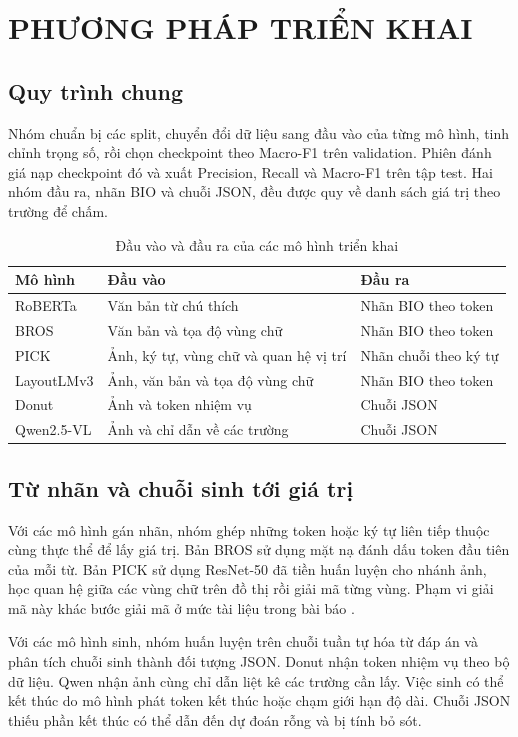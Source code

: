 \chapter{PHƯƠNG PHÁP TRIỂN KHAI}
\section{Quy trình chung}
Nhóm chuẩn bị các split, chuyển đổi dữ liệu sang đầu vào của từng mô hình, tinh chỉnh trọng số, rồi chọn checkpoint theo Macro-F1 trên validation. Phiên đánh giá nạp checkpoint đó và xuất Precision, Recall và Macro-F1 trên tập test. Hai nhóm đầu ra, nhãn BIO và chuỗi JSON, đều được quy về danh sách giá trị theo trường để chấm.

\begin{table}[htbp]
\centering
\renewcommand{\arraystretch}{1.25}
\caption{Đầu vào và đầu ra của các mô hình triển khai}
\begin{tabularx}{\textwidth}{lXX}
\toprule
\textbf{Mô hình} & \textbf{Đầu vào} & \textbf{Đầu ra} \\
\midrule
RoBERTa & Văn bản từ chú thích & Nhãn BIO theo token \\
BROS & Văn bản và tọa độ vùng chữ & Nhãn BIO theo token \\
PICK & Ảnh, ký tự, vùng chữ và quan hệ vị trí & Nhãn chuỗi theo ký tự \\
LayoutLMv3 & Ảnh, văn bản và tọa độ vùng chữ & Nhãn BIO theo token \\
Donut & Ảnh và token nhiệm vụ & Chuỗi JSON \\
Qwen2.5-VL & Ảnh và chỉ dẫn về các trường & Chuỗi JSON \\
\bottomrule
\end{tabularx}
\end{table}

\section{Từ nhãn và chuỗi sinh tới giá trị}
Với các mô hình gán nhãn, nhóm ghép những token hoặc ký tự liên tiếp thuộc cùng thực thể để lấy giá trị. Bản BROS sử dụng mặt nạ đánh dấu token đầu tiên của mỗi từ. Bản PICK sử dụng ResNet-50 đã tiền huấn luyện cho nhánh ảnh, học quan hệ giữa các vùng chữ trên đồ thị rồi giải mã từng vùng. Phạm vi giải mã này khác bước giải mã ở mức tài liệu trong bài báo \parencite{yu2020}.

Với các mô hình sinh, nhóm huấn luyện trên chuỗi tuần tự hóa từ đáp án và phân tích chuỗi sinh thành đối tượng JSON. Donut nhận token nhiệm vụ theo bộ dữ liệu. Qwen nhận ảnh cùng chỉ dẫn liệt kê các trường cần lấy. Việc sinh có thể kết thúc do mô hình phát token kết thúc hoặc chạm giới hạn độ dài. Chuỗi JSON thiếu phần kết thúc có thể dẫn đến dự đoán rỗng và bị tính bỏ sót.

